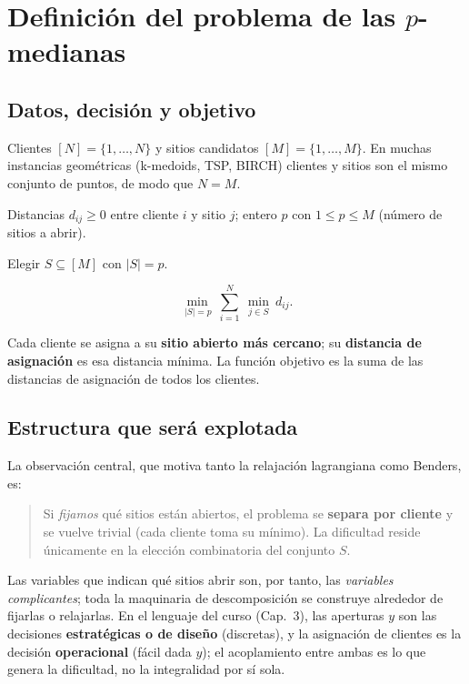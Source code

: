 \section{Definición del problema de las \texorpdfstring{$p$}{p}-medianas}
\label{sec:definicion}

\subsection{Datos, decisión y objetivo}
\begin{description}[leftmargin=1.5em]
  \item[Conjuntos.] Clientes $[N]=\{1,\dots,N\}$ y sitios candidatos $[M]=\{1,\dots,M\}$. En
        muchas instancias geométricas (k-medoids, TSP, BIRCH) clientes y sitios son el mismo
        conjunto de puntos, de modo que $N=M$.
  \item[Parámetros.] Distancias $d_{ij}\ge 0$ entre cliente $i$ y sitio $j$; entero $p$ con
        $1\le p\le M$ (número de sitios a abrir).
  \item[Decisión.] Elegir $S\subseteq[M]$ con $|S|=p$.
  \item[Objetivo.]
        \[
          \min_{\,|S|=p}\ \sum_{i=1}^{N}\ \min_{j\in S}\ d_{ij}.
        \]
\end{description}

Cada cliente se asigna a su \textbf{sitio abierto más cercano}; su \textbf{distancia de
asignación} es esa distancia mínima. La función objetivo es la suma de las distancias de
asignación de todos los clientes.

\subsection{Estructura que será explotada}
La observación central, que motiva tanto la relajación lagrangiana como Benders, es:

\begin{quote}
Si \emph{fijamos} qué sitios están abiertos, el problema se \textbf{separa por cliente} y se
vuelve trivial (cada cliente toma su mínimo). La dificultad reside únicamente en la elección
combinatoria del conjunto $S$.
\end{quote}

Las variables que indican qué sitios abrir son, por tanto, las \emph{variables complicantes};
toda la maquinaria de descomposición se construye alrededor de fijarlas o relajarlas. En el
lenguaje del curso (Cap.~3), las aperturas $y$ son las decisiones \textbf{estratégicas o de
diseño} (discretas), y la asignación de clientes es la decisión \textbf{operacional} (fácil dada
$y$); el acoplamiento entre ambas es lo que genera la dificultad, no la integralidad por sí sola.

